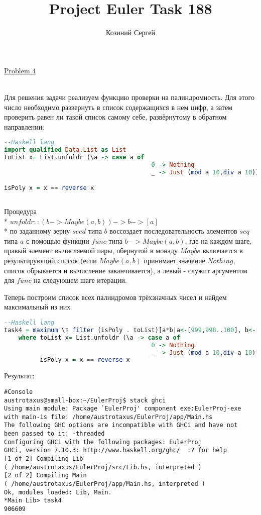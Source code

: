 \documentclass[11pt,a4paper]{article}
\title{Project Euler Task 188}
\author{Козиний Сергей}
\begin{document}
    
\maketitle
\href{''https://projecteuler.net/problem=4''}{Problem 4}

\\

Для решения задачи реализуем функцию проверки на палиндромность. Для этого число необходимо развернуть в список содержащихся в нем цифр, а затем проверить равен ли такой список самому себе, развёрнутому в обратном направлении:

\begin{lstlisting}[language=Haskell]
  --Haskell lang
import qualified Data.List as List
toList x= List.unfoldr (\a -> case a of
                                         0 -> Nothing
                                         _ -> Just (mod a 10,div a 10)) x

isPoly x = x == reverse x
  
\end{lstlisting}
Процедура \\*
$unfoldr :: (b -> Maybe (a, b)) -> b -> [a] $\\*
по заданному зерну $seed$ типа $b$ воссоздает последовательность элементов $seq$ типа $a$ с помощью функции $func$ типа  $b -> Maybe (a, b)$, где на каждом шаге, правый элемент вычисляемой пары, обернутой в монаду $Maybe$ включается в результирующий список (если $Maybe(a,b)$ принимает значение $Nothing$, список обрывается и вычисление заканчивается), а левый - служит аргументом для $func$ на следующем шаге итерации. 

Теперь построим список всех палиндромов трёхзначных чисел и найдем максимальный из них
\begin{lstlisting}[language=Haskell]
  --Haskell lang
task4 = maximum \$ filter (isPoly . toList)[a*b|a<-[999,998..100], b<-[999,998..100]]
    where toList x= List.unfoldr (\a -> case a of
                                         0 -> Nothing
                                         _ -> Just (mod a 10,div a 10)) x
          isPoly x = x == reverse x

\end{lstlisting} 

Результат:

\begin{lstlisting}
#Console
austrotaxus@small-box:~/EulerProj$ stack ghci
Using main module: Package `EulerProj' component exe:EulerProj-exe
with main-is file: /home/austrotaxus/EulerProj/app/Main.hs
The following GHC options are incompatible with GHCi and have not
been passed to it: -threaded
Configuring GHCi with the following packages: EulerProj
GHCi, version 7.10.3: http://www.haskell.org/ghc/  :? for help
[1 of 2] Compiling Lib
( /home/austrotaxus/EulerProj/src/Lib.hs, interpreted )
[2 of 2] Compiling Main
( /home/austrotaxus/EulerProj/app/Main.hs, interpreted )
Ok, modules loaded: Lib, Main. 
*Main Lib> task4
906609
\end{lstlisting}
\end{document}
